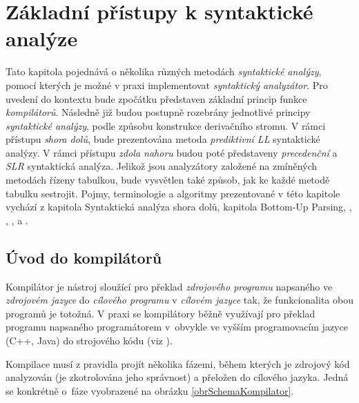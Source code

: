 \chapter{Základní přístupy k syntaktické analýze} \label{kapitola:ZakladniPristupyKSyntaktickeAnalyze}

Tato kapitola pojednává o několika různých metodách \emph{syntaktické analýzy}, pomocí kterých je možné v praxi implementovat \emph{syntaktický analyzátor}. Pro uvedení do kontextu bude zpočátku představen
základní princip funkce \emph{kompilátorů}. Následně již budou postupně rozebrány jednotlivé principy \emph{syntaktické analýzy}, podle způsobu konstrukce derivačního stromu. V rámci přístupu
\emph{shora dolů}, bude prezentována metoda \emph{prediktivní LL} syntaktické analýzy. V rámci přístupu \emph{zdola nahoru} budou poté představeny \emph{precedenční} a
\emph{SLR} syntaktická analýza. Jelikož jsou analyzátory založené na zmíněných metodách řízeny tabulkou, bude vysvětlen také způsob, jak ke každé metodě tabulku sestrojit.
Pojmy, terminologie a algoritmy prezentované v této kapitole vychází z \cite{IFJ:2017} kapitola Syntaktická analýza shora dolů, \cite{VYPa:2022} kapitola Bottom-Up Parsing, \cite{Alfred:2007:Compilers},
\cite{Meduna:2000:AutomataAndLanguages}, \cite{Meduna:2008:ElementsOfCompilerDesign}, \cite{Meduna:2014:FormalLanguagesAndComputation} a \cite{nextbridge:2023:LanguagesDifference}.

\section{Úvod do kompilátorů}
Kompilátor je nástroj sloužící pro překlad \emph{zdrojového programu} napsaného ve \emph{zdrojovém jazyce} do
\emph{cílového programu} v \emph{cílovém jazyce} tak, že funkcionalita obou programů je totožná. V praxi se kompilátory
běžně využívají pro překlad programu napsaného programátorem v~obvykle ve vyšším programovacím jazyce (C++, Java) do strojového kódu
(viz \cite{Meduna:2008:ElementsOfCompilerDesign}).

Kompilace musí z pravidla projít několika fázemi, během kterých je zdrojový kód analyzován (je zkotrolována jeho správnost) a přeložen do cílového jazyka.
Jedná se konkrétně o~fáze vyobrazené na obrázku \ref{obrSchemaKompilator}.

